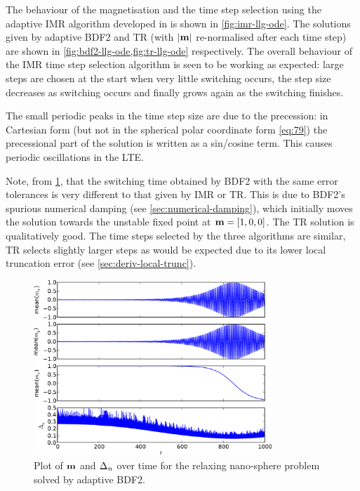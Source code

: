 The behaviour of the magnetisation and the time step selection using the adaptive IMR algorithm developed in  is shown in \cref{fig:imr-llg-ode}.
The solutions given by adaptive BDF2 and TR (with $\left|{\boldsymbol{\mathrm{m}}} \right|$ re-normalised after each time step)  are shown in \cref{fig:bdf2-llg-ode,fig:tr-llg-ode} respectively.
The overall behaviour of the IMR time step selection algorithm is seen to be working as expected: large steps are chosen at the start when very little switching occurs, the step size decreases as switching occurs and finally grows again as the switching finishes.

The small periodic peaks in the time step size are due to the precession: in Cartesian form (but not in the spherical polar coordinate form \cref{eq:79}) the precessional part of the solution is written as a sin/cosine term.
This causes periodic oscillations in the LTE.

Note, from \cref{fig:bdf2-llg-ode}, that the switching time obtained by BDF2 with the same error tolerances is very different to that given by IMR or TR.
This is due to BDF2's spurious numerical damping (see \cref{sec:numerical-damping}), which initially moves the solution towards the unstable fixed point at $\boldsymbol{\mathrm{m}}=[1, 0, 0]$.
The TR solution is qualitatively good.
The time steps selected by the three algorithms are similar, TR selects slightly larger steps as would be expected due to its lower local truncation error (see \cref{sec:deriv-local-trunc}).


\begin{figure}
  \centering
  \includegraphics[width=0.8\textwidth]{plots/aimr-sphere-relax/bdf21-meanmxsvs-meanmysvs-meanmzsvs-dtsvstimes.pdf}
  \caption{Plot of $\boldsymbol{\mathrm{m}}$ and $\Delta_{n}$ over time for the relaxing nano-sphere problem solved by adaptive BDF2.}
  \label{fig:bdf2-llg-ode}
\end{figure}


